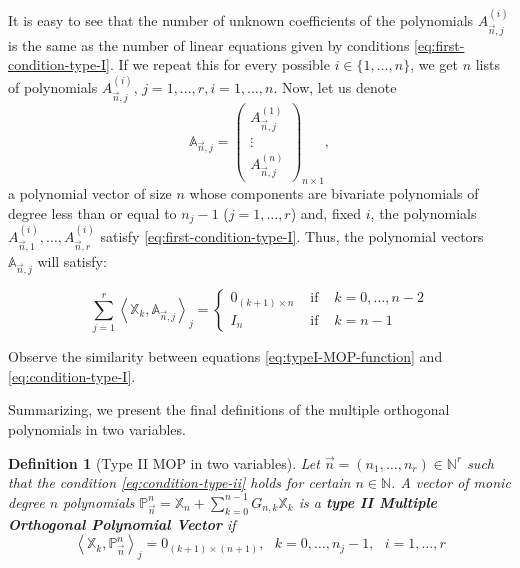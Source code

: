 \documentclass[12pt,a4]{report}
\theoremstyle{plain}
\newtheorem{definition}[theorem]{Definition}
\newcommand{\N}[0]{\mathbb{N}}
\newcommand{\prodesc}[2]{\left\langle #1 , #2 \right\rangle}
\begin{document}
It is easy to see that the number of unknown coefficients of the polynomials $A_{\vec n,j}^{(i)}$ is the same as the number of linear equations given by conditions \eqref{eq:first-condition-type-I}. If we repeat this for every possible $i\in\{1,\dots,n\}$, we get $n$ lists of polynomials $A_{\vec n, j}^{(i)}$, $j=1,\dots,r, i=1,\dots,n$. Now, let us denote
$$
\mathbb A_{\vec n,j} = \begin{pmatrix}
    A_{\vec n, j}^{(1)} \\ \vdots \\ A_{\vec n, j}^{(n)}
\end{pmatrix}_{n\times 1},
$$
a polynomial vector of size $n$ whose components are bivariate polynomials of degree less than or equal to $n_j-1$ ($j=1,\dots,r$) and, fixed $i$, the polynomials $A_{\vec n, 1}^{(i)},\dots,A_{\vec n, r}^{(i)}$ satisfy \eqref{eq:first-condition-type-I}. Thus, the polynomial vectors $\mathbb A_{\vec n,j}$ will satisfy:

\begin{equation}
    \label{eq:condition-type-I}
    \sum_{j=1}^r \prodesc{\mathbb X_k}{\mathbb A_{\vec n,j}}_j = \left\{\begin{array}{ccl}
        0_{(k+1)\times n} &   \text{ if } & k=0,\dots,n-2 \\
        I_n & \text{ if } & k=n-1      
    \end{array}\right.
\end{equation}

Observe the similarity between equations \eqref{eq:typeI-MOP-function} and \eqref{eq:condition-type-I}.
    
Summarizing, we present the final definitions of the multiple orthogonal polynomials in two variables.

\begin{definition}[Type II MOP in two variables]
    Let $\vec n = (n_1, \dots, n_r)\in \N^r$ such that the condition \eqref{eq:condition-type-ii} holds for certain $n\in\N$. A vector of monic degree $n$ polynomials $\mathbb P_{\vec n}^n = \mathbb X_n + \displaystyle\sum_{k=0}^{n-1} G_{n,k} \mathbb X_k$ is a \textbf{type II Multiple Orthogonal Polynomial Vector} if 
    \begin{equation}
        \label{eq:typeII-MOP-2vars}
        \prodesc{\mathbb X_k}{\mathbb P_{\vec n}^n}_j = 0_{(k+1)\times (n+1)}, \ \ \ k=0,\dots,n_j-1, \ \ \ i=1,\dots,r
    \end{equation}      
\end{definition}
\end{document}
